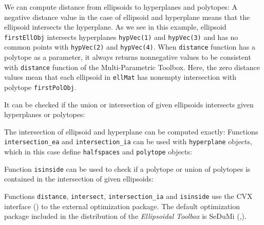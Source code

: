 We can compute distance from ellipsoids to hyperplanes and polytopes:
A negative distance value in the case of ellipsoid and hyperplane means that
the ellipsoid intersects the hyperplane. As we see in this example, ellipsoid
{\tt firstEllObj} intersects  hyperplanes {\tt hypVec(1)} and {\tt hypVec(3)} and has
no common points with {\tt hypVec(2)} and {\tt hypVec(4)}. When {\tt distance} function
has a polytope as a parameter, it always returns nonnegative values to be
consistent with {\tt distance} function of the Multi-Parametric Toolbox.
Here, the zero distance values mean that each ellipsoid in {\tt ellMat} has
nonempty intersection with polytope {\tt firstPolObj}.

It can be checked if the union or intersection of given ellipsoids intersects
given hyperplanes or polytopes:



The intersection of ellipsoid and hyperplane can be computed exactly:
Functions {\tt intersection\_ea} and {\tt intersection\_ia} can be used
with {\tt hyperplane} objects, which in this case define {\tt halfspaces} and
{\tt polytope} objects:

Function {\tt isinside} can be used to check if a polytope or union of
polytopes is contained in the intersection of given ellipsoids:

Functions {\tt distance}, {\tt intersect}, {\tt intersection\_ia} and
{\tt isinside} use the CVX interface (\cite{cvxhp}) to the
external optimization package. The default optimization package included
in the distribution of the {\it Ellipsoidal Toolbox} is SeDuMi
(\cite{sedumi},\cite{sedumihp}).



